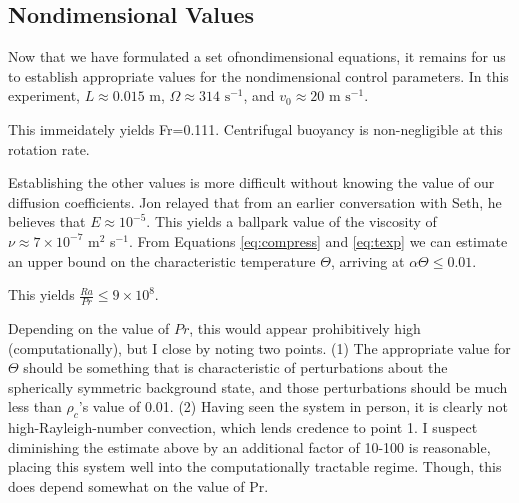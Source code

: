 \subsection{Nondimensional Values}
Now that we have formulated a set ofnondimensional equations, it remains for us to establish appropriate values for the nondimensional control parameters.
In this experiment, $L \approx 0.015$ m, $\Omega \approx 314 \,\,\mathrm{ s}^{-1}$, and $v_0 \approx 20 \,\,\mathrm{m}\,\,\mathrm{s}^{-1}$.  

This immeidately yields Fr=0.111.  Centrifugal buoyancy is non-negligible at this rotation rate.

Establishing the other values is more difficult without knowing the value of our diffusion coefficients.  Jon relayed that from an earlier conversation with Seth, he believes that $E\approx 10^{-5}$.   This yields a ballpark value of the viscosity of $\nu\approx 7\times 10^{-7}$ m$^2$ s$^{-1}$.  From Equations \ref{eq:compress} and \ref{eq:texp} we can estimate an upper bound on the characteristic temperature $\Theta$, arriving at $\alpha\Theta\leq 0.01$.   

This yields $\frac{Ra}{Pr}\leq 9\times 10^{8}$.   

Depending on the value of $Pr$, this would appear prohibitively high (computationally), but I close by noting two points.  (1)  The appropriate value for $\Theta$ should be something that is characteristic of perturbations about the spherically symmetric background state, and those perturbations should be much less than $\rho_c$'s value of 0.01.  (2)  Having seen the system in person, it is clearly not high-Rayleigh-number convection, which lends credence to point 1.   I suspect diminishing the estimate above by an additional factor of 10-100 is reasonable, placing this system well into the computationally tractable regime.  Though, this does depend somewhat on the value of Pr.
 

\clearpage


